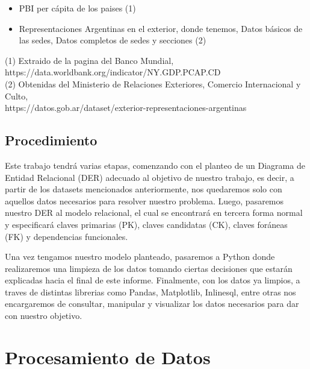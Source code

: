 \documentclass[10pt,a4paper]{article}
\begin{document}
\begin{itemize}
	\item PBI per cápita de los paises (1)
	\item Representaciones Argentinas en el exterior, donde tenemos, Datos básicos de las sedes, Datos completos de sedes y secciones (2)
\end{itemize}

\noindent (1) Extraido de la pagina del Banco Mundial, https://data.worldbank.org/indicator/NY.GDP.PCAP.CD \\

\noindent (2) Obtenidas del Ministerio de Relaciones Exteriores, Comercio Internacional y Culto, \\ https://datos.gob.ar/dataset/exterior-representaciones-argentinas \vspace{0.1cm}
 
\subsection{Procedimiento} \vspace{0.3cm}

\indent Este trabajo tendrá varias etapas, comenzando con el planteo de un Diagrama de Entidad Relacional (DER) adecuado al objetivo de nuestro trabajo, es decir, a partir de los datasets mencionados anteriormente, nos quedaremos solo con aquellos datos necesarios para resolver nuestro problema. Luego, pasaremos nuestro DER al modelo relacional, el cual se encontrará en tercera forma normal y especificará claves primarias (PK), claves candidatas (CK), claves foráneas (FK) y dependencias funcionales. \par
Una vez tengamos nuestro modelo planteado, pasaremos a Python donde realizaremos una limpieza de los datos tomando ciertas decisiones que estarán explicadas hacia el final de este informe. 
Finalmente, con los datos ya limpios, a traves de distintas librerias como Pandas, Matplotlib, Inlinesql, entre otras nos encargaremos de consultar, manipular y visualizar los datos necesarios para dar con nuestro objetivo.


\newpage

\section{Procesamiento de Datos} \vspace{0.2cm}
\end{document}
